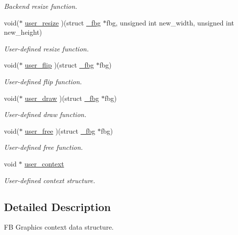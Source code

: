 \begin{DoxyCompactItemize}
\begin{DoxyCompactList}\small\item\em Backend resize function. \end{DoxyCompactList}\item 
void($\ast$ \mbox{\hyperlink{struct__fbg_a68add70dac4b055809c1bcab1e65b18d}{user\+\_\+resize}} )(struct \mbox{\hyperlink{struct__fbg}{\+\_\+fbg}} $\ast$fbg, unsigned int new\+\_\+width, unsigned int new\+\_\+height)
\begin{DoxyCompactList}\small\item\em User-\/defined resize function. \end{DoxyCompactList}\item 
void($\ast$ \mbox{\hyperlink{struct__fbg_a3f2ad2eb06555cdbe2d18f541231cb37}{user\+\_\+flip}} )(struct \mbox{\hyperlink{struct__fbg}{\+\_\+fbg}} $\ast$fbg)
\begin{DoxyCompactList}\small\item\em User-\/defined flip function. \end{DoxyCompactList}\item 
void($\ast$ \mbox{\hyperlink{struct__fbg_ac66a762877982c6f381a7cfd54a8f17e}{user\+\_\+draw}} )(struct \mbox{\hyperlink{struct__fbg}{\+\_\+fbg}} $\ast$fbg)
\begin{DoxyCompactList}\small\item\em User-\/defined draw function. \end{DoxyCompactList}\item 
void($\ast$ \mbox{\hyperlink{struct__fbg_a88d48b502672cfb8bd2c94ea3feac8d0}{user\+\_\+free}} )(struct \mbox{\hyperlink{struct__fbg}{\+\_\+fbg}} $\ast$fbg)
\begin{DoxyCompactList}\small\item\em User-\/defined free function. \end{DoxyCompactList}\item 
void $\ast$ \mbox{\hyperlink{struct__fbg_ae3ecac18abee9dedabacaca9bb063bde}{user\+\_\+context}}
\begin{DoxyCompactList}\small\item\em User-\/defined context structure. \end{DoxyCompactList}\end{DoxyCompactItemize}


\subsection{Detailed Description}
FB Graphics context data structure. 

